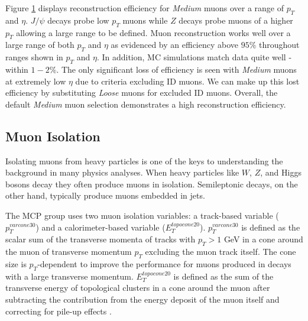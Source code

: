 \begin{figure}[!h]
  \label{fig:efficiency}
\end{figure}

Figure \ref{fig:efficiency} displays reconstruction efficiency for \textit{Medium} muons over a range of $p_T$ and $\eta$. $J/\psi$ decays probe low $p_T$ muons while $Z$ decays probe muons of a higher $p_T$ allowing a large range to be defined.  Muon reconstruction works well over a large range of both $p_T$ and $\eta$ as evidenced by an efficiency above $95\%$ throughout ranges shown in $p_T$ and $\eta$. In addition, MC simulations match data quite well - within $1-2\%$. The only significant loss of efficiency is seen with \textit{Medium} muons at extremely low $\eta$ due to criteria excluding ID muons. We can make up this lost efficiency by substituting \textit{Loose} muons for excluded ID muons. Overall, the default \textit{Medium} muon selection demonstrates a high reconstruction efficiency. 

\subsection{Muon Isolation} 
\par \hspace{20pt} Isolating muons from heavy particles is one of the keys to understanding the background in many physics analyses. When heavy particles like $W$, $Z$, and Higgs bosons decay they often produce muons in isolation. Semileptonic decays, on the other hand, typically produce muons embedded in jets.

\par \hspace{20pt} The MCP group uses two muon isolation variables: a track-based variable ($p_T^{varcone30}$) and a calorimeter-based variable ($E_T^{topocone20}$). $p_T^{varcone30}$ is defined as the scalar sum of the transverse momenta of tracks with $p_T > 1$ GeV in a cone around the muon of transverse momentum $p_T$ excluding the muon track itself. The cone size is $p_T$-dependent to improve the performance for muons produced in decays with a large transverse momentum. $E_T^{topocone20}$ is defined as the sum of the transverse energy of topological clusters in a cone around the muon after subtracting the contribution from the energy deposit of the muon itself and correcting for pile-up effects \cite{jets}. 


